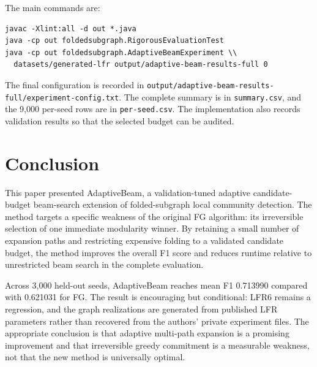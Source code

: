 \documentclass[10pt,journal,compsoc]{IEEEtran}
\begin{document}
The main commands are:
\begin{verbatim}
javac -Xlint:all -d out *.java
java -cp out foldedsubgraph.RigorousEvaluationTest
java -cp out foldedsubgraph.AdaptiveBeamExperiment \\
  datasets/generated-lfr output/adaptive-beam-results-full 0
\end{verbatim}

The final configuration is recorded in
\texttt{output/adaptive-beam-results-full/experiment-config.txt}. The complete
summary is in \texttt{summary.csv}, and the 9,000 per-seed rows are in
\texttt{per-seed.csv}. The implementation also records validation results so
that the selected budget can be audited.

\section{Conclusion}
This paper presented AdaptiveBeam, a validation-tuned adaptive
candidate-budget beam-search extension of folded-subgraph local community
detection. The method targets a specific weakness of the original FG
algorithm: its irreversible selection of one immediate modularity winner. By
retaining a small number of expansion paths and restricting expensive folding
to a validated candidate budget, the method improves the overall F1 score and
reduces runtime relative to unrestricted beam search in the complete
evaluation.

Across 3,000 held-out seeds, AdaptiveBeam reaches mean F1 0.713990 compared
with 0.621031 for FG. The result is encouraging but conditional: LFR6 remains
a regression, and the graph realizations are generated from published LFR
parameters rather than recovered from the authors' private experiment files.
The appropriate conclusion is that adaptive multi-path expansion is a
promising improvement and that irreversible greedy commitment is a measurable
weakness, not that the new method is universally optimal.
\end{document}
